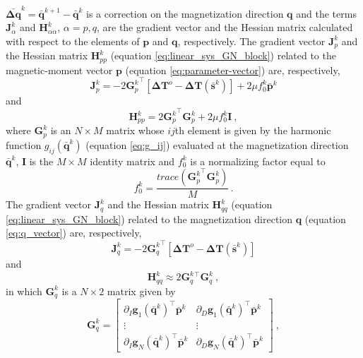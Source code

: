 $\bar{\mathbf{\Delta q}}^{k} = \bar{\mathbf{q}}^{k+1} - \bar{\mathbf{q}}^{k}$ 
is a correction on the magnetization direction $\mathbf{q}$ and the terms 
$\mathbf{J}_{\alpha}^{k}$ and $\mathbf{H}_{\alpha \alpha}^{k}$, $\alpha = p,q$, 
are the gradient vector and the Hessian matrix calculated with respect to the elements of 
$\mathbf{p}$ and $\mathbf{q}$, respectively. 
The gradient vector $\mathbf{J}_{p}^{k}$ and the Hessian matrix $\mathbf{H}_{pp}^{k}$ 
(equation \ref{eq:linear_sys_GN_block}) related to the magnetic-moment vector 
$\mathbf{p}$ (equation \ref{eq:parameter-vector}) are, respectively,
\begin{equation}
\mathbf{J}_{p}^{k} = -2 {\mathbf{G}_{p}^{k}}^{\top} 
\left[ \mathbf{\Delta T}^{o} - \mathbf{\Delta T} (\bar{\mathbf{s}}^{k}) \right] + 
2\mu f_{0}^{k} \bar{\mathbf{p}}^{k} 
\label{eq:grad_p}
\end{equation}   
and   
\begin{equation}
\mathbf{H}_{pp}^{k} = 2 {\mathbf{G}_{p}^{k}}^{\top} \mathbf{G}_{p}^{k} + 
2 \mu f_{0}^{k} \mathbf{I} \: ,
\label{eq:hess_p}
\end{equation}
where $\mathbf{G}_p^{k}$ is an $N \times M$ matrix whose $ij$th element is given by the harmonic 
function $g_{ij}(\bar{\mathbf{q}}^{k})$ (equation \ref{eq:g_ij}) evaluated at the 
magnetization direction $\bar{\mathbf{q}}^{k}$, $\mathbf{I}$ is the $M \times M$ identity matrix and 
$f_{0}^{k}$ is a  normalizing factor equal to
\begin{equation}
f_{0}^{k} = \dfrac{trace \left({\mathbf{G}_{p}^{k}}^{\top} \mathbf{G}_{p}^{k} \right)}{M} \, .
\label{eq:norm_factor}
\end{equation}
The gradient vector $\mathbf{J}_{q}^{k}$ and the Hessian matrix $\mathbf{H}_{qq}^{k}$ 
(equation \ref{eq:linear_sys_GN_block}) related to the magnetization direction 
$\mathbf{q}$ (equation \ref{eq:q_vector}) are, respectively,
\begin{equation}
\mathbf{J}_{q}^{k} = -2 {\mathbf{G}_{q}^{k}}^{\top} 
\left[ \mathbf{\Delta T}^{o} - \mathbf{\Delta T} (\bar{\mathbf{s}}^{k}) \right]
\label{eq:grad_q}
\end{equation}   
and   
\begin{equation}
\mathbf{H}_{qq}^{k} \approx 2 {\mathbf{G}_{q}^{k}}{^\top} \mathbf{G}_{q}^{k} \: ,
\label{eq:hess_q}
\end{equation}
in which $\mathbf{G}_{q}^{k}$ is a $N \times 2$ matrix given by 
\begin{equation}
\mathbf{G}_{q}^{k} = \begin{bmatrix}
\partial_{I} \mathbf{g}_{1}(\bar{\mathbf{q}}^{k})^{\top} \bar{\mathbf{p}}^{k} & 
\partial_{D} \mathbf{g}_{1}(\bar{\mathbf{q}}^{k})^{\top} \bar{\mathbf{p}}^{k} \\
\vdots & \vdots  \\
\partial_{I} \mathbf{g}_{N}(\bar{\mathbf{q}}^{k})^{\top} \bar{\mathbf{p}}^{k} & 
\partial_{D} \mathbf{g}_{N}(\bar{\mathbf{q}}^{k})^{\top} \bar{\mathbf{p}}^{k} 
\end{bmatrix} \: ,
\label{eq:Gq}
\end{equation}
